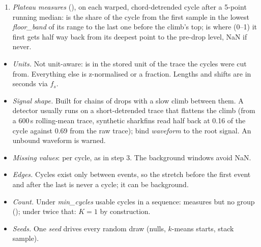 \begin{enumerate}
  $\sigma^2$ variant, shown first) of the whole stack and of each group, at three points:
  fixed-length cuts, after warping, after alignment. The verdict null is \emph{null\_draws}
  draws of pseudo-cycles cut where no event lies, with lengths drawn from the real cycles,
  through the same chord, warp, refinement and alignment; a group is judged against the null
  group of its own entropy rank from the same $K$-means on each draw. A value beats the null
  when it is below every draw and more than 3 robust SDs (1.4826 MAD, floored at 0.002 of
  the median) below the draws' median. A group's key is unmarked only when eq.~17 and
  $\sigma^2$ both beat it; otherwise \texttt{\textasciitilde noise\_like}. If more than half
  the pseudo-cycles found no free stretch (a chain that fills its span), or the whole stack
  beats the background but not the phase copies of its own cycles (a background of another
  colour), every group is \texttt{\textasciitilde untested}.
\item \emph{Plateau measures} (), on each warped, chord-detrended cycle after a
  5-point running median:  is the share of the cycle from the first
  sample in the lowest \emph{floor\_band} of its range to the last one before the climb's
  top;  is where (0--1) it first gets half way back from its
  deepest point to the pre-drop level, NaN if never.
\end{enumerate}

\begin{itemize}
\item \emph{Units.} Not unit-aware:  is in the stored unit of the trace
  the cycles were cut from. Everything else is z-normalised or a fraction. Lengths and
  shifts are in seconds via $f_s$.
\item \emph{Signal shape.} Built for chains of drops with a slow climb between them. A
  detector usually runs on a short-detrended trace that flattens the climb (from a 600\,s
  rolling-mean trace, synthetic sharkfins read half back at 0.16 of the cycle against 0.69
  from the raw trace); bind \emph{waveform} to the root signal. An unbound waveform is
  warned.
\item \emph{Missing values}: per cycle, as in step 3. The background windows avoid NaN.
\item \emph{Edges.} Cycles exist only between events, so the stretch before the first event
  and after the last is never a cycle; it can be background.
\item \emph{Count.} Under \emph{min\_cycles} usable cycles in a sequence: measures but no
  group (); under twice that: $K = 1$ by construction.
\item \emph{Seeds.} One \emph{seed} drives every random draw (nulls, $k$-means starts, stack
  sample).
\end{itemize}


